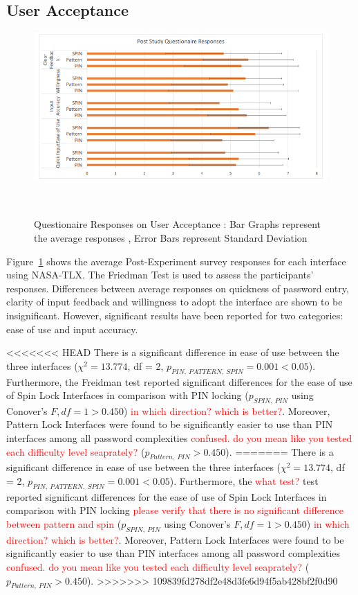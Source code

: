\documentclass{sigchi}
\newcommand{\comment}[1]{\textcolor{red}{#1}}
\begin{document}
\subsection{User Acceptance}
\begin{figure}[b]
	\centering
	\includegraphics[width=1\columnwidth]{figures/Responses.png}
	\caption{Questionaire Responses on User Acceptance : Bar Graphs represent the average responses , Error Bars represent Standard Deviation}~\label{fig:Responses}
\end{figure}
 Figure~\ref{fig:Responses} shows the average Post-Experiment survey responses for each interface using NASA-TLX.  The Friedman Test is used to assess the participants' responses. Differences between average responses on quickness of password entry, clarity of input feedback and willingness to adopt the interface are shown to be insignificant. However, significant results have been reported for two categories: ease of use and input accuracy.

<<<<<<< HEAD
There is a significant difference in ease of use between the three interfaces ($\chi^{2} = 13.774$, df = 2, $p_{PIN,\:PATTERN, \:SPIN} = 0.001 < 0.05$).  Furthermore, the Freidman test reported significant differences for the ease of use of Spin Lock  Interfaces in comparison with PIN locking   ($p_{SPIN,\:PIN}$ using Conover's $F, df = 1 >  0.450$) \comment{in which direction? which is better?}.  Moreover, Pattern Lock Interfaces were found to be significantly easier to use than PIN interfaces among all password complexities \comment{confused. do you mean like you tested each difficulty level seaprately?} ($p_{Pattern,\:PIN} > 0.450$). 
=======
There is a significant difference in ease of use between the three interfaces ($\chi^{2} = 13.774$, df = 2, $p_{PIN,\:PATTERN, \:SPIN} = 0.001 < 0.05$).  Furthermore, the \comment{what test?} test reported significant differences for the ease of use of Spin Lock  Interfaces in comparison with PIN locking \comment{please verify that there is no significant difference between pattern and spin}  ($p_{SPIN,\:PIN}$ using Conover's $F, df = 1 >  0.450$) \comment{in which direction? which is better?}.  Moreover, Pattern Lock Interfaces were found to be significantly easier to use than PIN interfaces among all password complexities \comment{confused. do you mean like you tested each difficulty level seaprately?} ($p_{Pattern,\:PIN} > 0.450$). 
>>>>>>> 109839fd278df2e48d3fe6d94f5ab428bf2f0d90
\end{document}
